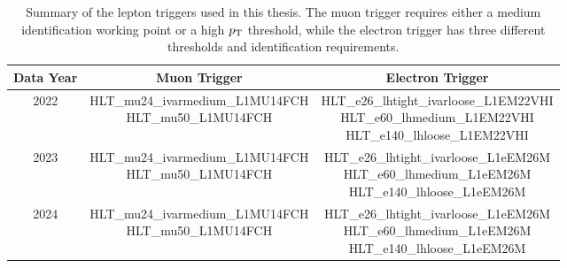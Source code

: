\begin{table}
  \centering
  \begin{tabular}{c|c|c}
    \hline
    \textbf{Data Year} & \textbf{Muon Trigger} & \textbf{Electron Trigger} \\
    \hline
    2022 & \makecell[l]{HLT\_mu24\_ivarmedium\_L1MU14FCH \\ HLT\_mu50\_L1MU14FCH} & \makecell[l]{HLT\_e26\_lhtight\_ivarloose\_L1EM22VHI \\ HLT\_e60\_lhmedium\_L1EM22VHI \\ HLT\_e140\_lhloose\_L1EM22VHI} \\
    \hline
    2023 & \makecell[l]{HLT\_mu24\_ivarmedium\_L1MU14FCH \\ HLT\_mu50\_L1MU14FCH} & \makecell[l]{HLT\_e26\_lhtight\_ivarloose\_L1eEM26M \\ HLT\_e60\_lhmedium\_L1eEM26M \\ HLT\_e140\_lhloose\_L1eEM26M} \\
    \hline
    2024 & \makecell[l]{HLT\_mu24\_ivarmedium\_L1MU14FCH \\ HLT\_mu50\_L1MU14FCH} & \makecell[l]{HLT\_e26\_lhtight\_ivarloose\_L1eEM26M \\ HLT\_e60\_lhmedium\_L1eEM26M \\ HLT\_e140\_lhloose\_L1eEM26M} \\
    \hline
  \end{tabular}
  \caption{Summary of the lepton triggers used in this thesis. The muon trigger requires either a medium identification working point or a high $p_{\mathrm{T}}$ threshold, while the electron trigger has three different thresholds and identification requirements.}\label{tab:triggers}
\end{table}

